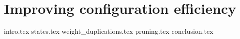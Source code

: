 \chapter{Improving configuration efficiency}
\label{ch:7}
{intro.tex}
{states.tex}
{weight_duplications.tex}
{pruning.tex}
{conclusion.tex}